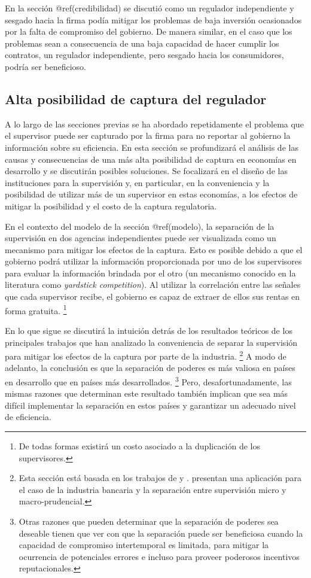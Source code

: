 \documentclass[
  12pt,
  spanish,
]{book}
\begin{document}
En la sección @ref(credibilidad) se discutió como un regulador
independiente y sesgado hacia la firma podía mitigar los problemas de
baja inversión ocasionados por la falta de compromiso del gobierno. De
manera similar, en el caso que los problemas sean a consecuencia de una
baja capacidad de hacer cumplir los contratos, un regulador
independiente, pero sesgado hacia los consumidores, podría ser
beneficioso.

\hypertarget{captura}{%
\subsection{Alta posibilidad de captura del regulador}\label{captura}}

A lo largo de las secciones previas se ha abordado repetidamente el
problema que el supervisor puede ser capturado por la firma para no
reportar al gobierno la información sobre su eficiencia. En esta sección
se profundizará el análisis de las causas y consecuencias de una más
alta posibilidad de captura en economías en desarrollo y se discutirán
posibles soluciones. Se focalizará en el diseño de las instituciones
para la supervisión y, en particular, en la conveniencia y la
posibilidad de utilizar más de un supervisor en estas economías, a los
efectos de mitigar la posibilidad y el costo de la captura regulatoria.

En el contexto del modelo de la sección @ref(modelo), la separación de
la supervisión en dos agencias independientes puede ser visualizada como
un mecanismo para mitigar los efectos de la captura. Esto es posible
debido a que el gobierno podrá utilizar la información proporcionada por
uno de los supervisores para evaluar la información brindada por el otro
(un mecanismo conocido en la literatura como \emph{yardstick
competition}). Al utilizar la correlación entre las señales que cada
supervisor recibe, el gobierno es capaz de extraer de ellos sus rentas
en forma gratuita. \footnote{De todas formas existirá un costo asociado
  a la duplicación de los supervisores.}

En lo que sigue se discutirá la intuición detrás de los resultados
teóricos de los principales trabajos que han analizado la conveniencia
de separar la supervisión para mitigar los efectos de la captura por
parte de la industria. \footnote{Esta sección está basada en los
  trabajos de \citet{Laffont1999} y \citet{Laffont2005}.
  \citet{Boyer2012} presentan una aplicación para el caso de la
  industria bancaria y la separación entre supervisión micro y
  macro-prudencial.} A modo de adelanto, la conclusión es que la
separación de poderes es más valiosa en países en desarrollo que en
países más desarrollados. \footnote{Otras razones que pueden determinar
  que la separación de poderes sea deseable tienen que ver con que la
  separación puede ser beneficiosa cuando la capacidad de compromiso
  intertemporal es limitada, para mitigar la ocurrencia de potenciales
  errores e incluso para proveer poderosos incentivos reputacionales.}
Pero, desafortunadamente, las mismas razones que determinan este
resultado también implican que sea más difícil implementar la separación
en estos países y garantizar un adecuado nivel de eficiencia.
\end{document}
